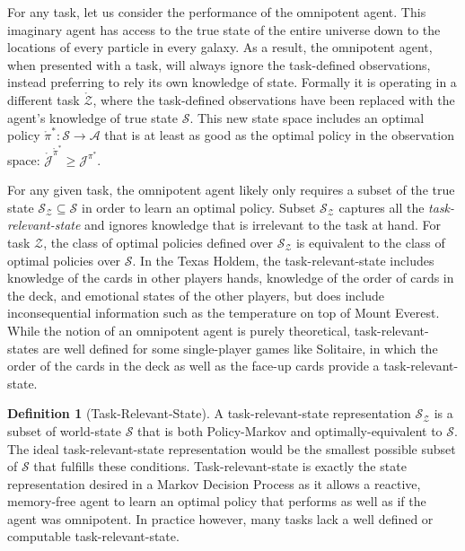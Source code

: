 \documentclass{article} %
\theoremstyle{definition}
\newtheorem{definition}{Definition}[section]
\begin{document}
For any task, let us consider the performance of the omnipotent
agent. This imaginary agent has access to the true state of the entire
universe down to the locations of every particle in every galaxy. As a
result, the omnipotent agent, when presented with a task, will always
ignore the task-defined observations, instead preferring to rely its
own knowledge of state. Formally it is operating in a different task
$\mathring{\mathcal{Z}}$, where the task-defined observations have
been replaced with the agent's knowledge of true state
$\mathcal{S}$. This new state space includes an optimal policy
$\mathring{\pi}^*: \mathcal{S} \rightarrow \mathcal{A}$ that is at
least as good as the optimal policy in the observation space:
$\mathring{\mathcal{J}}^{\mathring{\pi}^*} \ge \mathcal{J}^{\pi^*}$.

For any given task, the omnipotent agent likely only requires a subset
of the true state $\mathcal{S}_\mathcal{Z} \subseteq \mathcal{S}$ in
order to learn an optimal policy. Subset $\mathcal{S}_\mathcal{Z}$
captures all the \textit{task-relevant-state} and ignores knowledge
that is irrelevant to the task at hand. For task $\mathcal{Z}$, the
class of optimal policies defined over $\mathcal{S}_\mathcal{Z}$ is
equivalent to the class of optimal policies over $\mathcal{S}$. In the
Texas Holdem, the task-relevant-state includes knowledge of the cards
in other players hands, knowledge of the order of cards in the deck,
and emotional states of the other players, but does include
inconsequential information such as the temperature on top of Mount
Everest. While the notion of an omnipotent agent is purely
theoretical, task-relevant-states are well defined for some
single-player games like Solitaire, in which the order of the cards in
the deck as well as the face-up cards provide a task-relevant-state.

\begin{definition}[Task-Relevant-State]
A task-relevant-state representation $\mathcal{S}_\mathcal{Z}$ is a
subset of world-state $\mathcal{S}$ that is both Policy-Markov and
optimally-equivalent to $\mathcal{S}$. The ideal task-relevant-state
representation would be the smallest possible subset of $\mathcal{S}$
that fulfills these conditions. Task-relevant-state is exactly the
state representation desired in a Markov Decision Process as it allows
a reactive, memory-free agent to learn an optimal policy that performs
as well as if the agent was omnipotent. In practice however, many
tasks lack a well defined or computable task-relevant-state.
\end{definition}
\end{document}
